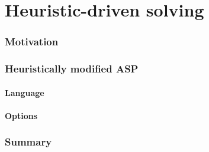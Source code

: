 \part{Heuristic-driven solving}
\section{Motivation}



\section{Heuristically modified ASP}
\subsection{Language}


\subsection{Options}


\section{Summary}

%
